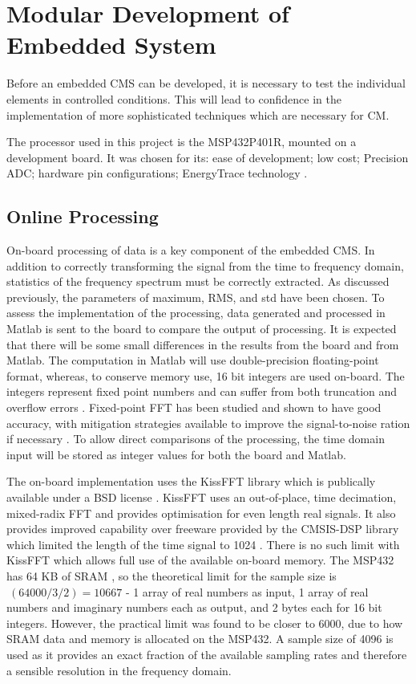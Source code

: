 \chapter{Modular Development of Embedded System}

Before an embedded CMS can be developed, it is necessary to test the individual elements in controlled conditions.
This will lead to confidence in the implementation of more sophisticated techniques which are necessary for CM.
\par

The processor used in this project is the MSP432P401R, mounted on a development board.
It was chosen for its: ease of development; low cost; Precision ADC; hardware pin configurations; EnergyTrace technology \cite{MSP432_Launchpad}.

\section{Online Processing}

On-board processing of data is a key component of the embedded CMS.
In addition to correctly transforming the signal from the time to frequency domain, statistics of the frequency spectrum must be correctly extracted.
As discussed previously, the parameters of maximum, RMS, and std have been chosen.
To assess the implementation of the processing, data generated and processed in Matlab is sent to the board to compare the output of processing.
It is expected that there will be some small differences in the results from the board and from Matlab.
The computation in Matlab will use double-precision floating-point format, whereas, to conserve memory use, 16 bit integers are used on-board.
The integers represent fixed point numbers and can suffer from both truncation and overflow errors \cite{Qmath}.
Fixed-point FFT has been studied and shown to have good accuracy, with mitigation strategies available to improve the signal-to-noise ration if necessary \cite{Fixed_point_FFT}\cite{Fixed_point_FFT_accuracy}.
To allow direct comparisons of the processing, the time domain input will be stored as integer values for both the board and Matlab.
\par

The on-board implementation uses the KissFFT library which is publically available under a BSD license \cite{KissFFT}.
KissFFT uses an out-of-place, time decimation, mixed-radix FFT and provides optimisation for even length real signals.
It also provides improved capability over freeware provided by the CMSIS-DSP library which limited the length of the time signal to 1024 \cite{CMSIS_DSP}.
There is no such limit with KissFFT which allows full use of the available on-board memory.
The MSP432 has 64 KB of SRAM \cite{MSP432_Launchpad}, so the theoretical limit for the sample size is $~(64000 / 3 / 2) = 10667$ - 1 array of real numbers as input, 1 array of real numbers and imaginary numbers each as output, and 2 bytes each for 16 bit integers.
However, the practical limit was found to be closer to 6000, due to how SRAM data and memory is allocated on the MSP432.
A sample size of 4096 is used as it provides an exact fraction of the available sampling rates and therefore a sensible resolution in the frequency domain.


